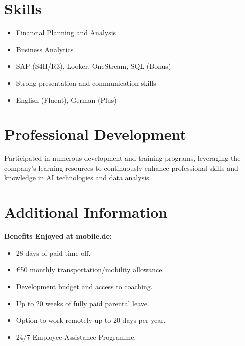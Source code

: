 \documentclass[a4paper,10pt]{article}
\begin{document}
\section*{Skills}
\begin{itemize}[leftmargin=0.5cm]
    \item Financial Planning and Analysis
    \item Business Analytics
    \item SAP (S4H/R3), Looker, OneStream, SQL (Bonus)
    \item Strong presentation and communication skills
    \item English (Fluent), German (Plus)
\end{itemize}

\section*{Professional Development}
Participated in numerous development and training programs, leveraging the company's learning resources to continuously enhance professional skills and knowledge in AI technologies and data analysis.

\section*{Additional Information}
\textbf{Benefits Enjoyed at mobile.de:}
\begin{itemize}[leftmargin=0.5cm]
    \item 28 days of paid time off.
    \item €50 monthly transportation/mobility allowance.
    \item Development budget and access to coaching.
    \item Up to 20 weeks of fully paid parental leave.
    \item Option to work remotely up to 20 days per year.
    \item 24/7 Employee Assistance Programme.
\end{itemize}
\end{document}
